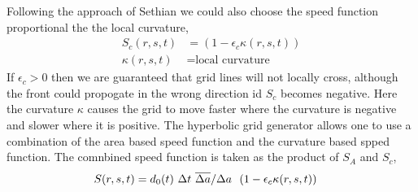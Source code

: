 Following the approach of Sethian we could also choose the speed function proportional 
the the local curvature,
\begin{align*}
    S_c(r,s,t) &= (1-\epsilon_c \kappa(r,s,t)) \\
    \kappa(r,s,t) &= \mbox{local curvature}
\end{align*}
If $\epsilon_c>0$ then we are guaranteed that grid lines will not locally cross, although the front
could propogate in the wrong direction id $S_c$ becomes negative.
Here the curvature $\kappa$ causes the grid to move faster where the curvature is negative
and slower where it is positive. The hyperbolic grid generator allows one to use a combination
of the area based speed function and the curvature based spped function. 
The comnbined speed function is taken as the product of $S_A$ and $S_c$,
\begin{align*}
 S(r,s,t) & =  d_0(t) ~\Delta t ~ \overline{\Delta a} / \Delta a ~~(1-\epsilon_c \kappa(r,s,t))
\end{align*}


% 
% 
% 

